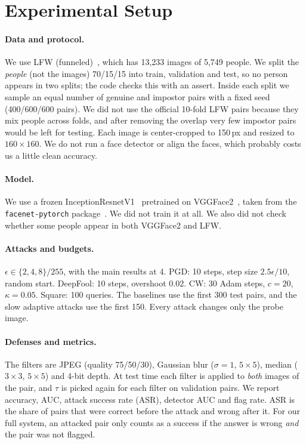 \section{Experimental Setup}
\label{sec:setup}
\paragraph{Data and protocol.} We use LFW (funneled)~\cite{huang2007lfw}, which has 13{,}233 images of 5{,}749 people. We split the \emph{people} (not the images) 70/15/15 into train, validation and test, so no person appears in two splits; the code checks this with an assert. Inside each split we sample an equal number of genuine and impostor pairs with a fixed seed (400/600/600 pairs). We did not use the official 10-fold LFW pairs because they mix people across folds, and after removing the overlap very few impostor pairs would be left for testing. Each image is center-cropped to 150\,px and resized to $160{\times}160$. We do not run a face detector or align the faces, which probably costs us a little clean accuracy.

\paragraph{Model.} We use a frozen InceptionResnetV1~\cite{szegedy2017inception} pretrained on VGGFace2~\cite{cao2018vggface2}, taken from the \texttt{facenet-pytorch} package~\cite{esler2019facenetpytorch}. We did not train it at all. We also did not check whether some people appear in both VGGFace2 and LFW.

\paragraph{Attacks and budgets.} $\epsilon\in\{2,4,8\}/255$, with the main results at 4. PGD: 10 steps, step size $2.5\epsilon/10$, random start. DeepFool: 10 steps, overshoot 0.02. CW: 30 Adam steps, $c{=}20$, $\kappa{=}0.05$. Square: 100 queries. The baselines use the first 300 test pairs, and the slow adaptive attacks use the first 150. Every attack changes only the probe image.

\paragraph{Defenses and metrics.} The filters are JPEG (quality 75/50/30), Gaussian blur ($\sigma{=}1$, $5{\times}5$), median ($3{\times}3$, $5{\times}5$) and 4-bit depth. At test time each filter is applied to \emph{both} images of the pair, and $\tau$ is picked again for each filter on validation pairs. We report accuracy, AUC, attack success rate (ASR), detector AUC and flag rate. ASR is the share of pairs that were correct before the attack and wrong after it. For our full system, an attacked pair only counts as a success if the answer is wrong \emph{and} the pair was not flagged.

